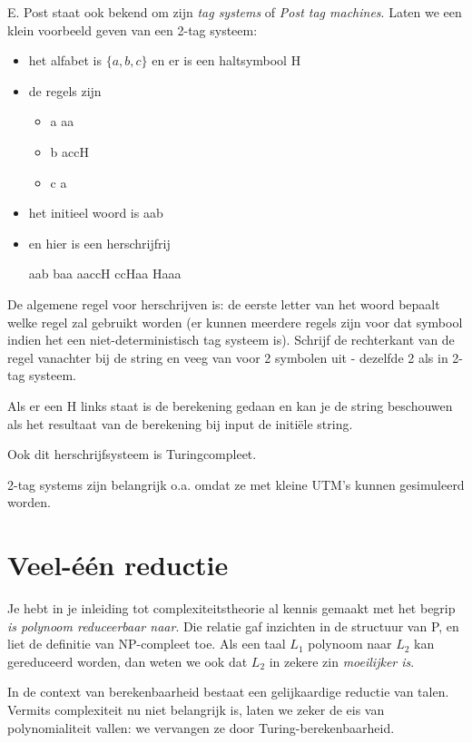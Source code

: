 E. Post staat ook bekend om zijn {\em tag systems} of {\em Post tag
machines}. Laten we een klein voorbeeld geven van een 2-tag systeem:

\begin{itemize}
\item het alfabet is $\{a,b,c\}$ en er is een haltsymbool H
\item de regels zijn
\begin{itemize}
\item a \rpijl aa
\item b \rpijl accH
\item c \rpijl a
\end{itemize}

\item het initieel woord is aab
\item en hier is een herschrijfrij

aab \rpijl baa \rpijl aaccH \rpijl ccHaa \rpijl Haaa
\end{itemize}


De algemene regel voor herschrijven is: de eerste letter van het woord
bepaalt welke regel zal gebruikt worden (er kunnen meerdere regels zijn
voor dat symbool indien het een niet-deterministisch tag systeem
is). Schrijf de rechterkant van de regel vanachter bij de string en
veeg van voor 2 symbolen uit - dezelfde 2 als in 2-tag systeem.


Als er een H links staat is de berekening gedaan en kan je de string
beschouwen als het resultaat van de berekening bij input de initi\"ele string.


Ook dit herschrijfsysteem is Turingcompleet.


2-tag systems zijn belangrijk o.a. omdat ze met kleine UTM's kunnen
gesimuleerd worden.


\section{Veel-\'{e}\'{e}n reductie}\label{mappingreduction}

Je hebt in je inleiding tot complexiteitstheorie al kennis gemaakt met
het begrip {\em is polynoom reduceerbaar naar}. Die relatie gaf 
inzichten in de structuur van P, en liet de definitie van NP-compleet
toe. Als een taal $L_1$ polynoom naar $L_2$ kan gereduceerd worden,
dan weten we ook dat $L_2$ in zekere zin {\em moeilijker is}.


In de context van berekenbaarheid bestaat een gelijkaardige reductie
van talen. Vermits complexiteit nu niet belangrijk is, laten we zeker
de eis van polynomialiteit vallen: we vervangen ze door
Turing-berekenbaarheid.
%


